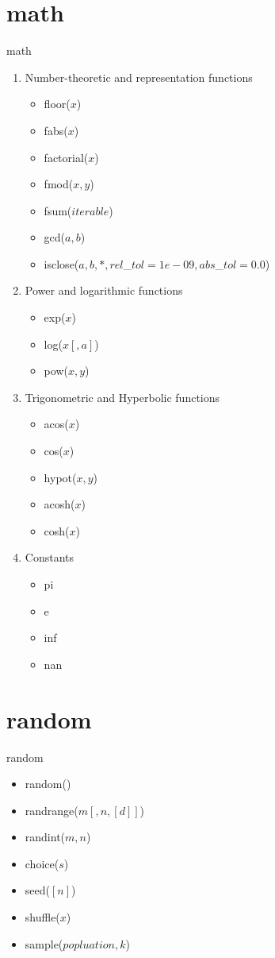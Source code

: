 \documentclass[xcolor=table]{mysld}
\begin{document}
\section{math}
\begin{frame}[allowframebreaks]{math}
\begin{enumerate}
\item Number-theoretic and representation functions
\begin{itemize}
\item floor($x$)
\item fabs($x$)
\item factorial($x$)
\item fmod($x,y$)
\item fsum($iterable$)
\item gcd($a,b$)
\item isclose($a,b,*,rel$\_$tol=1e-09, abs$\_$tol=0.0$)
\end{itemize}
\item Power and logarithmic functions
\begin{itemize}
\item exp($x$)
\item log($x[,a]$)
\item pow($x,y$)
\end{itemize}
\framebreak
\item Trigonometric and Hyperbolic functions
\begin{itemize}
\item acos($x$)
\item cos($x$)
\item hypot($x,y$)
\item acosh($x$)
\item cosh($x$)
\end{itemize}
\item Constants
\begin{itemize}
\item pi
\item e
\item inf
\item nan
\end{itemize}
\end{enumerate}
\end{frame}

\section{random}
\begin{frame}{random}
\begin{itemize}
\item random()
\item randrange($m[,n,[d]]$)
\item randint($m,n$)
\item choice($s$)
\item seed($[n]$)
\item shuffle($x$)
\item sample($popluation,k$)
\end{itemize}
\end{frame}
\end{document}
